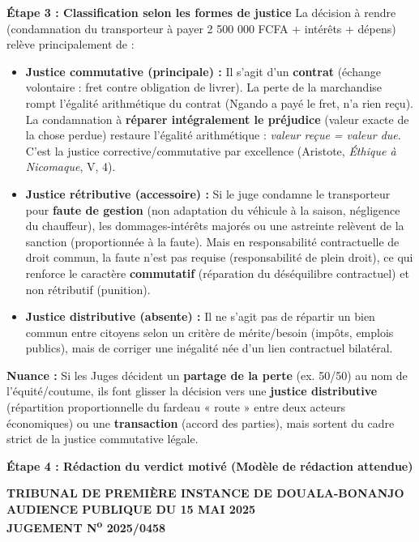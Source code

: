 \documentclass[11pt]{article}
\newcommand{\cle}[1]{{\popxbold\color{popdark}#1}}
\begin{document}
\begin{exoresolu}
\textbf{Étape 3 : Classification selon les formes de justice}
La décision à rendre (condamnation du transporteur à payer 2 500 000 FCFA + intérêts + dépens) relève principalement de :
\begin{itemize}
    \item \textbf{Justice commutative (principale) :} Il s'agit d'un \textbf{contrat} (échange volontaire : fret contre obligation de livrer). La perte de la marchandise rompt l'égalité arithmétique du contrat (Ngando a payé le fret, n'a rien reçu). La condamnation à \textbf{réparer intégralement le préjudice} (valeur exacte de la chose perdue) restaure l'égalité arithmétique : \textit{valeur reçue = valeur due}. C'est la \cle{justice corrective/commutative} par excellence (Aristote, \textit{Éthique à Nicomaque}, V, 4).
    \item \textbf{Justice rétributive (accessoire) :} Si le juge condamne le transporteur pour \textbf{faute de gestion} (non adaptation du véhicule à la saison, négligence du chauffeur), les dommages-intérêts majorés ou une astreinte relèvent de la sanction (proportionnée à la faute). Mais en responsabilité contractuelle de droit commun, la faute n'est pas requise (responsabilité de plein droit), ce qui renforce le caractère \textbf{commutatif} (réparation du déséquilibre contractuel) et non rétributif (punition).
    \item \textbf{Justice distributive (absente) :} Il ne s'agit pas de répartir un bien commun entre citoyens selon un critère de mérite/besoin (impôts, emplois publics), mais de corriger une inégalité née d'un lien contractuel bilatéral.
\end{itemize}
\textbf{Nuance :} Si les Juges décident un \textbf{partage de la perte} (ex. 50/50) au nom de l'équité/coutume, ils font glisser la décision vers une \textbf{justice distributive} (répartition proportionnelle du fardeau « route » entre deux acteurs économiques) ou une \textbf{transaction} (accord des parties), mais sortent du cadre strict de la justice commutative légale.

\textbf{Étape 4 : Rédaction du verdict motivé (Modèle de rédaction attendue)}

\begin{center}
\textbf{TRIBUNAL DE PREMIÈRE INSTANCE DE DOUALA-BONANJO}\\
\textbf{AUDIENCE PUBLIQUE DU 15 MAI 2025}\\
\textbf{JUGEMENT N\textsuperscript{o} 2025/0458}
\end{center}


\end{exoresolu}
\end{document}
